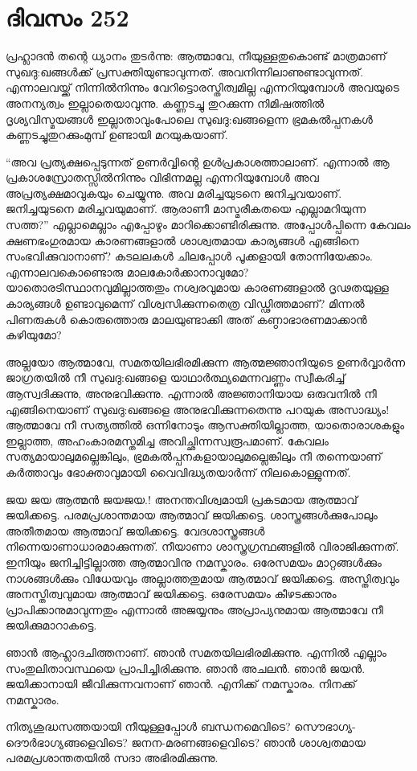 \section{ദിവസം 252}


പ്രഹ്ലാദന്‍ തന്റെ ധ്യാനം തുടര്‍ന്നു: ആത്മാവേ, നീയുള്ളതുകൊണ്ട് മാത്രമാണ് സുഖദു:ഖങ്ങള്‍ക്ക് പ്രസക്തിയുണ്ടാവുന്നത്. അവനിന്നിലാണുണ്ടാവുന്നത്. എന്നാലവയ്ക്ക് നിന്നില്‍നിന്നും  വേറിട്ടൊരസ്തിത്വമില്ല എന്നറിയുമ്പോള്‍ അവയുടെ അനന്യത്വം ഇല്ലാതെയാവുന്നു. കണ്ണടച്ചു തുറക്കുന്ന നിമിഷത്തില്‍ ദൃശ്യവിസ്മയങ്ങള്‍ ഇല്ലാതാവുംപോലെ  സുഖദു:ഖങ്ങളെന്ന ഭ്രമകല്‍പ്പനകള്‍ കണ്ണടച്ചുതുറക്കുംമുമ്പ് ഉണ്ടായി മറയുകയാണ്.     

“അവ പ്രത്യക്ഷപ്പെടുന്നത് ഉണര്‍വ്വിന്റെ ഉള്‍പ്രകാശത്താലാണ്. എന്നാല്‍ ആ പ്രകാശസ്രോതസ്സില്‍നിന്നും  വിഭിന്നമല്ല എന്നറിയുമ്പോള്‍ അവ അപ്രത്യക്ഷമാവുകയും ചെയ്യുന്നു. അവ മരിച്ചയുടനെ ജനിച്ചവയാണ്. ജനിച്ചയുടനെ മരിച്ചവയുമാണ്. ആരാണീ മാസ്മരീകതയെ എല്ലാമറിയുന്ന സത്ത?” എല്ലാമെല്ലാം എപ്പോഴും മാറിക്കൊണ്ടിരിക്കുന്നു. അപ്പോള്‍പ്പിന്നെ കേവലം ക്ഷണഭംഗുരമായ കാരണങ്ങളാല്‍ ശാശ്വതമായ കാര്യങ്ങള്‍ എങ്ങിനെ സംഭവിക്കുവാനാണ്? കടലലകള്‍ ചിലപ്പോള്‍ പൂക്കളായി തോന്നിയേക്കാം. എന്നാലവകൊണ്ടൊരു മാലകോര്‍ക്കാനാവുമോ? യാതൊരടിസ്ഥാനവുമില്ലാത്തതും നശ്വരവുമായ കാരണങ്ങളാല്‍ ദൃഢതയുള്ള കാര്യങ്ങള്‍ ഉണ്ടാവുമെന്ന് വിശ്വസിക്കുന്നതെത്ര വിഡ്ഢിത്തമാണ്? മിന്നല്‍ പിണരുകള്‍ കൊരുത്തൊരു മാലയുണ്ടാക്കി അത് കണ്ഠാഭാരണമാക്കാന്‍ കഴിയുമോ?

അല്ലയോ ആത്മാവേ, സമതയിലഭിരമിക്കുന്ന ആത്മജ്ഞാനിയുടെ ഉണര്‍വ്വാര്‍ന്ന ജാഗ്രതയില്‍ നീ സുഖദു:ഖങ്ങളെ യാഥാര്‍ത്ഥ്യമെന്നവണ്ണം സ്വീകരിച്ച് ആസ്വദിക്കുന്നു, അനുഭവിക്കുന്നു. എന്നാല്‍ അജ്ഞാനിയായ ഒരുവനില്‍ നീ എങ്ങിനെയാണ് സുഖദു:ഖങ്ങളെ അനുഭവിക്കുന്നതെന്നു പറയുക അസാദ്ധ്യം! ആത്മാവേ നീ സത്യത്തില്‍ ഒന്നിനോടും ആസക്തിയില്ലാത്ത, യാതൊരാശകളും ഇല്ലാത്ത, അഹംകാരമസ്തമിച്ച അവിച്ഛിന്നസ്വരൂപമാണ്. കേവലം സത്യമായാലുമല്ലെങ്കിലും, ഭ്രമകല്‍പ്പനകളായാലുമല്ലെങ്കിലും നീ തന്നെയാണ് കര്‍ത്താവും ഭോക്താവുമായി വൈവിദ്ധ്യതയാര്‍ന്ന് നിലകൊള്ളുന്നത്.
     
ജയ ജയ ആത്മന്‍ ജയജയ.! അനന്തവിശ്വമായി പ്രകടമായ ആത്മാവ് ജയിക്കട്ടെ. പരമപ്രശാന്തമായ ആത്മാവ് ജയിക്കട്ടെ. ശാസ്ത്രങ്ങള്‍ക്കുപോലും അതീതമായ ആത്മാവ് ജയിക്കട്ടെ. വേദശാസ്ത്രങ്ങള്‍ നിന്നെയാണാധാരമാക്കുന്നത്. നീയാണാ ശാസ്ത്രഗ്രന്ഥങ്ങളില്‍ വിരാജിക്കുന്നത്. ഇനിയും ജനിച്ചിട്ടില്ലാത്ത ആത്മാവിനു നമസ്കാരം. ഒരേസമയം മാറ്റങ്ങള്‍ക്കും നാശങ്ങള്‍ക്കും വിധേയവും അല്ലാത്തതുമായ ആത്മാവ് ജയിക്കട്ടെ. അസ്തിത്വവും അനസ്തിത്വവുമായ ആത്മാവ് ജയിക്കട്ടെ. ഒരേസമയം കീഴടക്കാനും പ്രാപിക്കാനുമാവുന്നതും എന്നാല്‍ അജയ്യനും അപ്രാപ്യനുമായ ആത്മാവേ നീ ജയിക്കുമാറാകട്ടെ.

ഞാന്‍ ആഹ്ലാദചിത്തനാണ്. ഞാന്‍ സമതയിലഭിരമിക്കുന്നു. എന്നില്‍ എല്ലാം സംതുലിതാവസ്ഥയെ പ്രാപിച്ചിരിക്കുന്നു. ഞാന്‍ അചലന്‍. ഞാന്‍ ജയന്‍. ജയിക്കാനായി ജീവിക്കുന്നവനാണ് ഞാന്‍. എനിക്ക് നമസ്കാരം. നിനക്ക് നമസ്കാരം.

നിത്യശുദ്ധസത്തയായി നീയുള്ളപ്പോള്‍ ബന്ധനമെവിടെ? സൌഭാഗ്യ-ദൌര്‍ഭാഗ്യങ്ങളെവിടെ? ജനന-മരണങ്ങളെവിടെ? ഞാന്‍ ശാശ്വതമായ പരമപ്രശാന്തതയില്‍ സദാ അഭിരമിക്കുന്നു.

